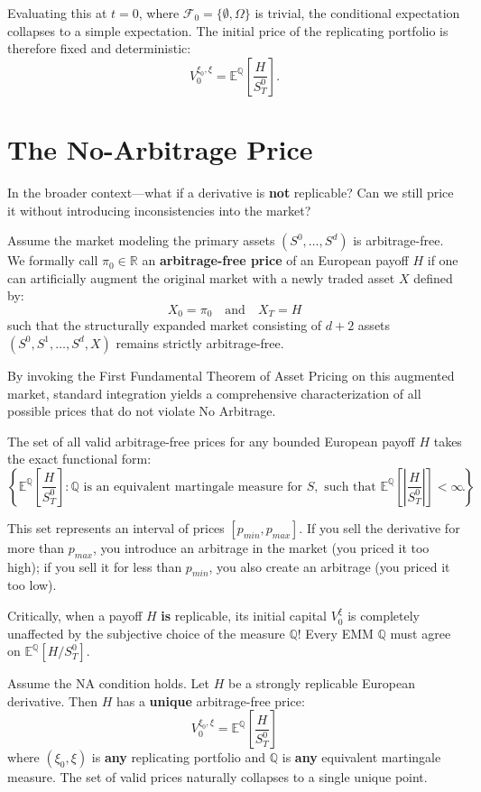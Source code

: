 Evaluating this at $t=0$, where $\mathcal{F}_0 = \{\emptyset, \Omega\}$ is trivial, the conditional expectation collapses to a simple expectation. The initial price of the replicating portfolio is therefore fixed and deterministic:
$$ V_0^{\xi_0, \xi} = \mathbb{E}^{\mathbb{Q}} \left[ \frac{H}{S_T^0} \right]. $$

\section{The No-Arbitrage Price}

In the broader context—what if a derivative is \textbf{not} replicable? Can we still price it without introducing inconsistencies into the market?

\begin{definition}
    Assume the market modeling the primary assets $(S^0, \dots, S^d)$ is arbitrage-free. We formally call $\pi_0 \in \mathbb{R}$ an \textbf{arbitrage-free price} of an European payoff $H$ if one can artificially augment the original market with a newly traded asset $X$ defined by:
    $$ X_0 = \pi_0 \quad \text{and} \quad X_T = H $$
    such that the structurally expanded market consisting of $d+2$ assets $(S^0, S^1, \dots, S^d, X)$ remains strictly arbitrage-free.
\end{definition}

By invoking the First Fundamental Theorem of Asset Pricing on this augmented market, standard integration yields a comprehensive characterization of all possible prices that do not violate No Arbitrage.

\begin{proposition}
    The set of all valid arbitrage-free prices for any bounded European payoff $H$ takes the exact functional form:
    $$ \left\{ \mathbb{E}^{\mathbb{Q}}\left[ \frac{H}{S_T^0} \right] : \mathbb{Q} \text{ is an equivalent martingale measure for } S, \text{ such that } \mathbb{E}^{\mathbb{Q}}\left[ \left| \frac{H}{S_T^0} \right| \right] < \infty \right\}. $$
\end{proposition}

This set represents an interval of prices $[p_{min}, p_{max}]$. If you sell the derivative for more than $p_{max}$, you introduce an arbitrage in the market (you priced it too high); if you sell it for less than $p_{min}$, you also create an arbitrage (you priced it too low).

Critically, when a payoff $H$ \textbf{is} replicable, its initial capital $V_0^{\xi}$ is completely unaffected by the subjective choice of the measure $\mathbb{Q}$! Every EMM $\mathbb{Q}$ must agree on $\mathbb{E}^{\mathbb{Q}}[H / S_T^0]$.

\begin{proposition} \label{prop:unique_price}
    Assume the NA condition holds. Let $H$ be a strongly replicable European derivative. Then $H$ has a \textbf{unique} arbitrage-free price:
    $$ V_0^{\xi_0, \xi} = \mathbb{E}^{\mathbb{Q}} \left[ \frac{H}{S_T^0} \right] $$
    where $(\xi_0, \xi)$ is \textbf{any} replicating portfolio and $\mathbb{Q}$ is \textbf{any} equivalent martingale measure. The set of valid prices naturally collapses to a single unique point.
\end{proposition}
